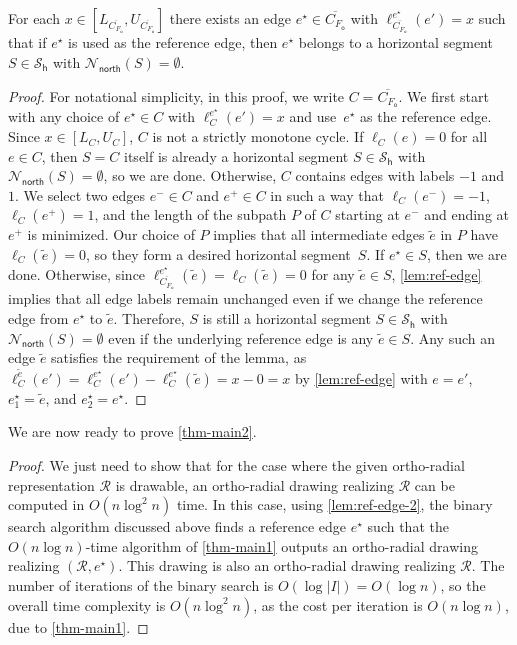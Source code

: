 \documentclass{article}\usepackage[a4paper,margin=20mm]{geometry}
\newcommand{\RR}{\mathcal{R}}
\newcommand{\FO}{F_\mathsf{o}}
\newcommand{\PH}{\mathcal{S}_\mathsf{h}}
\newcommand{\Nnorth}{\mathcal{N}_\mathsf{north}}
\newcommand{\eref}{e^\star}
\begin{document}
\begin{lemma}\label{lem:ref-edge-2}
For each  $x \in \left[L_{\overline{C_{\FO}}}, U_{\overline{C_{\FO}}}\right]$ there exists an edge $\eref \in \overline{C_{\FO}}$ with $\ell_{\overline{C_{\FO}}}^{\eref}(e') = x$ such that if $\eref$ is used as the reference edge, then $\eref$ belongs to a horizontal segment $S \in \PH$ with $\Nnorth(S) = \emptyset$.
\end{lemma}
\begin{proof}
For notational simplicity, in this proof, we write $C = \overline{C_{\FO}}$.
 We first start with any choice of  $\eref \in C$ with $\ell_C^{\eref}(e') = x$ and use~$\eref$ as the reference edge. Since $x \in \left[L_{C}, U_{C}\right]$, $C$ is not a strictly monotone cycle. If $\ell_C(e) = 0$ for all $e \in C$, then $S = C$ itself is already  a horizontal segment $S \in \PH$ with $\Nnorth(S) = \emptyset$, so we are done. Otherwise, $C$ contains edges with labels $-1$ and $1$. We select two edges $e^- \in C$  and $e^+ \in C$ in such a way that $\ell_C(e^-) = -1$, $\ell_C(e^+) = 1$, and the length of the subpath $P$ of $C$ starting at $e^-$ and ending at $e^+$ is minimized. Our choice of $P$ implies that all intermediate edges $\tilde{e}$ in $P$ have $\ell_C(\tilde{e}) = 0$, so they form a desired horizontal segment~$S$. If $\eref \in S$, then we are done. Otherwise,  since $\ell_{\overline{C_{\FO}}}^{\eref}(\tilde{e}) = \ell_{C}(\tilde{e}) = 0$ for any $\tilde{e} \in S$, \cref{lem:ref-edge} implies that all edge labels remain unchanged even if we change the reference edge from  $\eref$ to  $\tilde{e}$. Therefore, $S$ is still a horizontal segment $S \in \PH$ with $\Nnorth(S) = \emptyset$ even if the underlying reference edge is any $\tilde{e} \in S$. Any such an edge $\tilde{e}$ satisfies the requirement of the lemma, as  $\ell_C^{\tilde{e}}(e')=\ell_C^{\eref}(e')  - \ell_{C}^{\eref}(\tilde{e}) = x- 0 = x$ by \cref{lem:ref-edge} with $e=e'$, $\eref_1=\tilde{e}$, and $\eref_2 = \eref$.
\end{proof}



We are now ready to prove \cref{thm-main2}.

\thmtwo*

\begin{proof}%
We just need to show that for the case where the given  ortho-radial representation $\RR$ is drawable, an ortho-radial drawing realizing $\RR$ can be computed in $O(n \log^2 n)$ time.
In this case, using \cref{lem:ref-edge-2}, the  binary search algorithm discussed above finds a reference edge $\eref$ such that the $O(n \log n)$-time algorithm of \cref{thm-main1} outputs an ortho-radial drawing realizing $(\RR, \eref)$. This drawing is also an ortho-radial drawing realizing $\RR$. The number of iterations of the binary search is $O\left(\log |I|\right) = O(\log n)$, so the overall time complexity is $O(n \log^2 n)$, as the cost per iteration is $O(n \log n)$, due to \cref{thm-main1}.
\end{proof}
\end{document}
